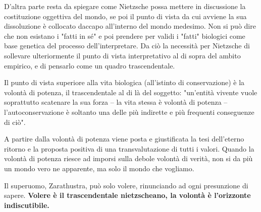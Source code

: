 D'altra parte resta da spiegare come Nietzsche possa mettere in discussione la costituzione oggettiva del mondo, se poi il punto di vista da cui avviene la sua dissoluzione è collocato daccapo all'interno del mondo medesimo. Non si può dire che non esistano i "fatti in sé" e poi prendere per validi i "fatti" biologici come base genetica del processo dell'interpretare. Da ciò la necessità per Nietzsche di sollevare  ulteriormente il punto di vista interpretativo al di sopra del ambito empirico, e di pensarlo come un quadro trascendentale.

Il punto di vista superiore alla vita biologica (all'istinto di conservazione) è la volontà di potenza, il trascendentale al di là del soggetto: "un'entità vivente vuole soprattutto scatenare la sua forza -- la vita stessa è volontà di potenza -- l'autoconservazione è soltanto una delle più indirette e più frequenti conseguenze di ciò".

A partire dalla volontà di potenza viene posta e giustificata la tesi dell'eterno ritorno e la proposta positiva di una transvalutazione di tutti i valori. Quando la volontà di potenza riesce ad imporsi sulla debole volontà di verità, non si da più un mondo vero ne apparente, ma solo il mondo che vogliamo.

Il superuomo, Zarathustra, può solo volere, rinunciando ad ogni presunzione di  sapere. \textbf{Volere è il trascendentale nietzscheano, la volontà è l'orizzonte indiscutibile.}


























